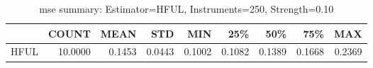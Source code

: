 \begin{table}[ht]
\centering
\caption{mse summary: Estimator=HFUL, Instruments=250, Strength=0.10}
\begin{tabular}{lrrrrrrrr}
\toprule
 & COUNT & MEAN & STD & MIN & 25\% & 50\% & 75\% & MAX \\
\midrule
HFUL & 10.0000 & 0.1453 & 0.0443 & 0.1002 & 0.1082 & 0.1389 & 0.1668 & 0.2369 \\
\bottomrule
\end{tabular}
\end{table}
